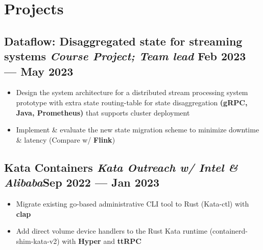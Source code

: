 \documentclass[a4,12pt]{article}
\newenvironment{zitemize}{
\begin{itemize}\itemsep0pt \parskip0pt \parsep1pt}
{\end{itemize}\vspace{-0.5cm}}
\begin{document}





\vspace{-0.2cm}

\section{\textbf{Projects}}

\vspace{-0.1cm}
\subsection*{Dataflow: Disaggregated state for streaming systems \normalfont\textit{Course Project; Team lead} \hfill \textbf{Feb 2023 --- May 2023}} 
\begin{zitemize}
    \item Design the system architecture for a distributed stream processing system prototype with extra state routing-table for state disaggregation \textbf{(gRPC, Java, Prometheus)} that supports cluster deployment
    \item Implement \& evaluate the new state migration scheme to minimize downtime \& latency (Compare w/ \textbf{Flink})
\end{zitemize}

\vspace{-0.2cm}

\subsection*{Kata Containers \normalfont\textit{Kata Outreach w/ Intel \& Alibaba}\hfill \textbf{Sep 2022 --- Jan 2023}} 
\begin{zitemize}
    \item Migrate existing go-based administrative CLI tool to Rust (Kata-ctl) with \textbf{clap}
    \item Add direct volume device handlers to the Rust Kata runtime (containerd-shim-kata-v2) with \textbf{Hyper} and \textbf{ttRPC}
\end{zitemize}
\end{document}
